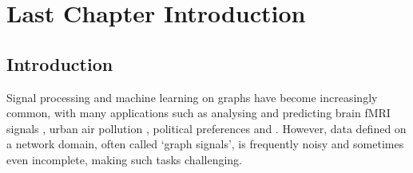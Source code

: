 

\chapter{\label{ch:2.5-litreview}Last Chapter Introduction}
\section{Introduction}

Signal processing and machine learning on graphs have become increasingly common, with many applications such as analysing and predicting brain fMRI signals \cite{itani2021graph}, urban air pollution \cite{jain2014big}, political preferences \cite{renoust2017estimating} and . However, data defined on a network domain, often called `graph signals', is frequently noisy and sometimes even incomplete, %
making such tasks challenging.

